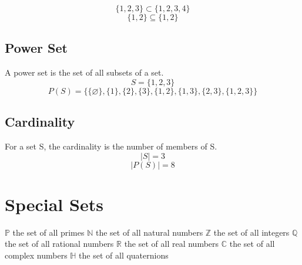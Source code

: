 \documentclass[10pt,a4paper]{report}
\begin{document}
\begin{equation}
	\{1,2,3\} \subset \{1,2,3,4\}
\end{equation}
\begin{equation}
	\{1,2\} \subseteq \{1,2\}
\end{equation}
\subsection*{Power Set}

A power set is the set of all subsets of a set.
\begin{equation*}
	S = \{1,2,3\}
\end{equation*}
\begin{equation}
	P(S) = \{\{\varnothing\},\{1\},\{2\},\{3\},\{1,2\},\{1,3\},\{2,3\},\{1,2,3\}\}
\end{equation}

\subsection*{Cardinality}
For a set S, the cardinality is the number of members of S.
\begin{equation*}
	|S| = 3
\end{equation*}
\begin{equation*}
|P(S)| = 8
\end{equation*}
\section{Special Sets}

\begin{math}
\mathbb{P}
\end{math}
the set of all primes
\newline
\begin{math}
\mathbb{N}
\end{math}
the set of all natural numbers
\newline
\begin{math}
\mathbb{Z}
\end{math}
the set of all integers
\newline
\begin{math}
\mathbb{Q}
\end{math}
the set of all rational numbers
\newline
\begin{math}
\mathbb{R}
\end{math}
the set of all real numbers
\newline
\begin{math}
\mathbb{C}
\end{math}
the set of all complex numbers
\newline
\begin{math}
\mathbb{H}
\end{math}
the set of all quaternions
\end{document}
